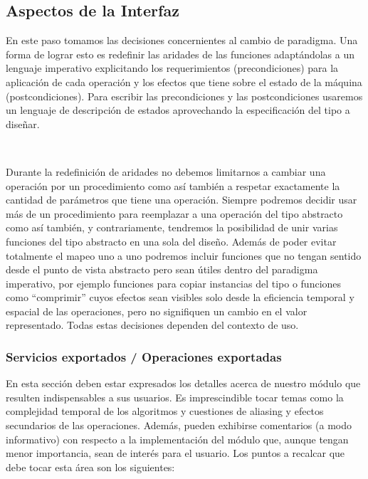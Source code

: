 \subsection{Aspectos de la Interfaz}

En este paso tomamos las decisiones concernientes al cambio de paradigma. Una forma de lograr esto es redefinir las aridades de las funciones adapt\'andolas a un lenguaje imperativo explicitando los requerimientos (precondiciones) para la aplicaci\'on de cada operaci\'on y los efectos que tiene sobre el estado de la m\'aquina (postcondiciones). Para escribir las precondiciones y las postcondiciones usaremos un lenguaje de descripci\'on de estados aprovechando la especificaci\'on del tipo a dise\~nar.

~

Durante la redefinici\'on de aridades no debemos limitarnos a cambiar una operaci\'on por un procedimiento como as\'i tambi\'en a respetar exactamente la cantidad de par\'ametros que tiene una operaci\'on. Siempre podremos decidir usar m\'as de un procedimiento para reemplazar a una operaci\'on del tipo abstracto como as\'i tambi\'en, y contrariamente, tendremos la posibilidad de unir varias funciones del tipo abstracto en una sola del dise\~no. Adem\'as de poder evitar totalmente el mapeo uno a uno podremos incluir funciones que no tengan sentido desde el punto de vista abstracto pero sean \'utiles dentro del paradigma imperativo, por ejemplo funciones para copiar instancias del tipo o funciones como ``comprimir'' cuyos efectos sean visibles solo desde la eficiencia temporal y espacial de las operaciones, pero no signifiquen un cambio en el valor representado. Todas estas decisiones dependen del contexto de uso.

\subsubsection{Servicios exportados / Operaciones exportadas}

En esta secci\'on deben estar expresados los detalles acerca de nuestro m\'odulo que resulten indispensables a sus usuarios. Es imprescindible tocar temas como la complejidad temporal de los algoritmos y cuestiones de aliasing y efectos secundarios de las operaciones. Adem\'as, pueden exhibirse comentarios (a modo informativo) con respecto a la implementaci\'on del m\'odulo que, aunque tengan menor importancia, sean de inter\'es para el usuario. Los puntos a recalcar que debe tocar esta \'area son los siguientes:

